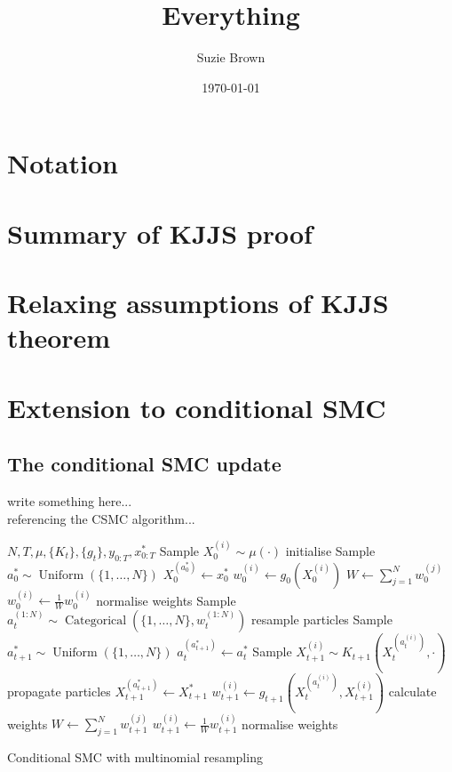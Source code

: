 \documentclass[fleqn]{article}
\title{Everything}
\author{Suzie Brown}
\date{\today}
\theoremstyle{definition}
\newcommand{\Cat}{\operatorname{Categorical}}
\newcommand{\Unif}{\operatorname{Uniform}}
\begin{document}
\maketitle
\thispagestyle{fancy}

\section{Notation}

\section{Summary of KJJS proof}

\section{Relaxing assumptions of KJJS theorem}

\section{Extension to conditional SMC}
\subsection{The conditional SMC update}\label{sec:condSMC_alg}
write something here...\\
referencing the CSMC algorithm...

\begin{algorithm}
\begin{algorithmic}[1]
\Require $N, T, \mu, \{K_t\}, \{g_t\}, y_{0:T}, x_{0:T}^*$
	\State Sample $X_0^{(i)} \sim \mu(\cdot)$ \Comment initialise
\EndFor
\State Sample $a_0^* \sim \Unif(\{1,\dots,N\})$
\State $X_0^{(a_0^*)} \gets x_0^*$
	\State $w_0^{(i)} \gets g_0(X_0^{(i)})$
\EndFor
\State $W \gets \sum_{j=1}^N w_{0}^{(j)}$
		\State $w_{0}^{(i)} \gets \frac{1}{W}w_{0}^{(i)}$ \Comment normalise weights
	\EndFor
{}
	\State Sample $a_t^{(1:N)} \sim \Cat(\{1,\dots,N\}, w_t^{(1:N)})$ \Comment resample particles
	\State Sample $a_{t+1}^* \sim \Unif(\{1,\dots,N\})$
	\State $a_t^{(a_{t+1}^*)} \gets a_t^*$
		\State Sample $X_{t+1}^{(i)} \sim K_{t+1}(X_t^{(a_t^{(i)})}, \cdot)$ \Comment propagate particles
	\EndFor
	\State $X_{t+1}^{(a_{t+1}^*)} \gets X_{t+1}^*$
		\State $w_{t+1}^{(i)} \gets g_{t+1}(X_t^{(a_t^{(i)})} , X_{t+1}^{(i)})$ \Comment calculate weights
	\EndFor
	\State $W \gets \sum_{j=1}^N w_{t+1}^{(j)}$
		\State $w_{t+1}^{(i)} \gets \frac{1}{W}w_{t+1}^{(i)}$ \Comment normalise weights
	\EndFor
\EndFor
\end{algorithmic}
\caption{Conditional SMC with multinomial resampling}
\label{alg:condSMC}
\end{algorithm}
\end{document}
